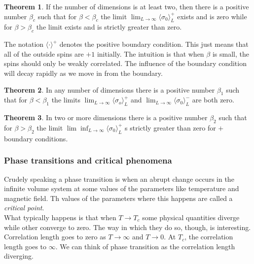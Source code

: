 \documentclass{book}
\theoremstyle{definition}
\newtheorem{thm}{Theorem}[section]
\newcommand{\la}{\langle}
\newcommand{\ra}{\rangle}
\begin{document}
\begin{thm}
	If the number of dimensions is at least two, then there is a positive number $\beta_c$ such that for $\beta < \beta_c$ the limit $\lim_{L\to \infty} \la \sigma_0 \ra_L^+$ exists and is zero while for $\beta > \beta_c$ the limit exists and is strictly greater than zero. 
\end{thm}

The notation $\la \cdot \ra^+$ denotes the positive boundary condition. This just means that all of the outside spins are $+1$ initially. The intuition is that when $\beta$ is small, the spins should only be weakly correlated. The influence of the boundary condition will decay rapidly as we move in from the boundary. 



\begin{thm}
	In any number of dimensions there is a positive number $\beta_1$ such that for $\beta < \beta_1$ the limits $\lim_{L\to \infty}\la \sigma_o \ra^+_L$ and $\lim_{L\to \infty} \la \sigma_0 \ra^-_L$ are both zero. 
\end{thm}




\begin{thm}
	In two or more dimensions there is a positive number $\beta_2$ such that for $\beta > \beta_2$ the limit $\lim \inf_{L\to \infty} \la \sigma_0 \ra^+_L$ s strictly greater than zero for $+$ boundary conditions. 
\end{thm}


\subsubsection{Phase transitions and critical phenomena}


Crudely speaking a phase transition is when an abrupt change occurs in the infinite volume system at some values of the parameters like temperature and magnetic field. Th values of the parameters where this happens are called a \textit{critical point}. \\

What typically happens is that when $T \to T_c$ some physical quantities diverge while other converge to zero. The way in which they do so, though, is interesting. Correlation length goes to zero as $T\to \infty$ and $T\to 0$. At $T_c$, the correlation length goes to $\infty$. We can think of phase transition as the correlation length diverging. \\
\end{document}
